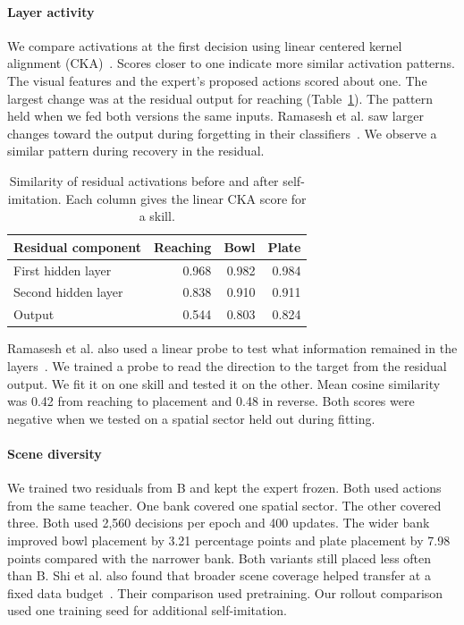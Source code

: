 \paragraph{Layer activity}
We compare activations at the first decision using linear centered kernel alignment (CKA)~\cite{kornblith2019}. Scores closer to one indicate more similar activation patterns. The visual features and the expert's proposed actions scored about one. The largest change was at the residual output for reaching (Table~\ref{tab:residual_cka}). The pattern held when we fed both versions the same inputs. Ramasesh et al. saw larger changes toward the output during forgetting in their classifiers~\cite[Fig.~1]{ramasesh2021}. We observe a similar pattern during recovery in the residual.

\begin{table}[!htb]
\caption{Similarity of residual activations before and after self-imitation. Each column gives the linear CKA score for a skill.}
\label{tab:residual_cka}\centering\small
\begin{tabular}{@{}lrrr@{}}\toprule
Residual component & Reaching & Bowl & Plate\\\midrule
First hidden layer & 0.968 & 0.982 & 0.984\\
Second hidden layer & 0.838 & 0.910 & 0.911\\
Output & 0.544 & 0.803 & 0.824\\\bottomrule
\end{tabular}
\end{table}

Ramasesh et al. also used a linear probe to test what information remained in the layers~\cite[App.~H]{ramasesh2021}. We trained a probe to read the direction to the target from the residual output. We fit it on one skill and tested it on the other. Mean cosine similarity was 0.42 from reaching to placement and 0.48 in reverse. Both scores were negative when we tested on a spatial sector held out during fitting.

\paragraph{Scene diversity}
We trained two residuals from B and kept the expert frozen. Both used actions from the same teacher. One bank covered one spatial sector. The other covered three. Both used 2,560 decisions per epoch and 400 updates. The wider bank improved bowl placement by 3.21 percentage points and plate placement by 7.98 points compared with the narrower bank. Both variants still placed less often than B. Shi et al. also found that broader scene coverage helped transfer at a fixed data budget~\cite[Sec.~III-B]{shi2026diversity}. Their comparison used pretraining. Our rollout comparison used one training seed for additional self-imitation.
